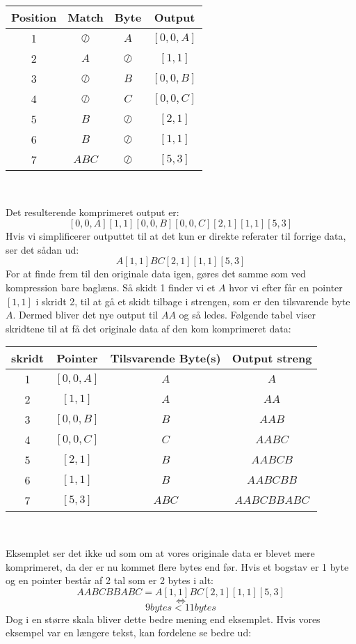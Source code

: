 \documentclass[12pt]{article}
\begin{document}
\begin{table}[ht]
  \centering
  \begin{tabular}{ |c|c|c|c| }
   \hline
   \textbf{Position} & \textbf{Match} & \textbf{Byte} & \textbf{Output} \\ 
   \hline
   1 & $\oslash$ & $A$ & \([0,0,A]\) \\
   \hline
   2 & $A$ & $\oslash$ & \([1,1]\) \\
   \hline
   3 & $\oslash$ & $B$ & \([0,0,B]\) \\
   \hline
   4 & $\oslash$ & $C$ & \([0,0,C]\) \\
   \hline
   5 & $B$ & $\oslash$ & \([2,1]\) \\
   \hline
   6 & $B$ & $\oslash$ & \([1,1]\) \\
   \hline
   7 & $ABC$ & $\oslash$ & \([5,3]\) \\
   \hline
  \end{tabular}\\
\end{table}
Det resulterende komprimeret output er:\\
\[[0,0,A]  [1,1]  [0,0,B]  [0,0,C]  [2,1]  [1,1]  [5,3]\]
Hvis vi simplificerer outputtet til at det kun er direkte referater til forrige data, ser det sådan ud:\\
\[A [1,1]  B C [2,1]  [1,1]  [5,3]\]
For at finde frem til den originale data igen, gøres det samme som ved kompression bare baglæns. 
Så skidt 1 finder vi et $A$ hvor vi efter får en pointer \([1,1]\) i skridt 2, til at gå et skidt tilbage i strengen, som er den tilsvarende byte $A$. 
Dermed bliver det nye output til $AA$ og så ledes. Følgende tabel viser skridtene til at få det originale data af den kom komprimeret data:
\begin{table}[ht]
  \centering
  \begin{tabular}{ |c|c|c|c| }
   \hline
   \textbf{skridt} & \textbf{Pointer} & \textbf{Tilsvarende Byte(s)} & \textbf{Output streng} \\ 
   \hline
   1 &  \([0,0,A]\) & $A$ & $A$ \\
   \hline
   2 & \([1,1]\) & $A$ & $AA$ \\
   \hline
   3 &  \([0,0,B]\) & $B$ & $AAB$ \\
   \hline
   4 &  \([0,0,C]\) & $C$ & $AABC$ \\
   \hline
   5 & \([2,1]\) & $B$ & $AABCB$ \\
   \hline
   6 & \([1,1]\) & $B$ & $AABCBB$ \\
   \hline
   7 & \([5,3]\) & $ABC$ & $AABCBBABC$ \\
   \hline
  \end{tabular}\\
\end{table}
Eksemplet ser det ikke ud som om at vores originale data er blevet mere komprimeret, 
da der er nu kommet flere bytes end før. Hvis et bogstav er 1 byte og en pointer består af 2 tal som er 2 bytes i alt:\\
\[AABCBBABC = A [1,1]  B C [2,1]  [1,1]  [5,3]\] 
\[\Longleftrightarrow \]
\[9  bytes < 11 bytes\] 
Dog i en større skala bliver dette bedre mening end eksemplet. Hvis vores eksempel var en længere tekst, kan fordelene se bedre ud:\\
\end{document}
